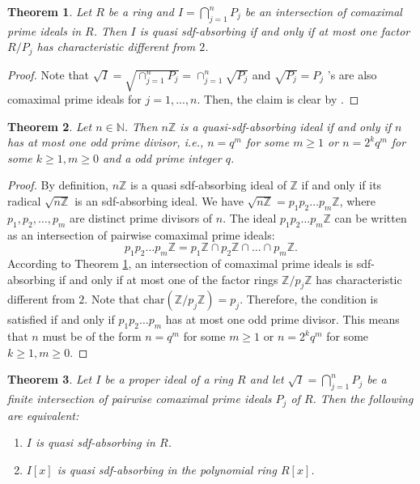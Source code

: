 \documentclass{amsart}%
\newtheorem{theorem}{Theorem}[section]
\begin{document}
\begin{theorem}
\label{Th} Let $R$ be a ring and $I=\bigcap_{j=1}^{n}P_{j}$ be an intersection
of comaximal prime ideals in $R$. Then $I$ is quasi sdf-absorbing if and only
if at most one factor $R/P_{j}$ has characteristic different from $2$.
\end{theorem}

\begin{proof}
Note that $\sqrt{I}=\sqrt{\cap_{j=1}^{n}P_{j}}=\cap_{j=1}^{n}\sqrt{P_{j}}$ and
$\sqrt{P_{j}}=P_{j}$ 's are also comaximal prime ideals for $j=1,...,n.$ Then,
the claim is clear by \cite[Theorem 4.1]{AB2024}.
\end{proof}

\begin{theorem}
Let $n\in\mathbb{N}$. Then $n\mathbb{Z}$ is a quasi-sdf-absorbing ideal if and
only if $n$ has at most one odd prime divisor, i.e., $n=q^{m}$ for some
$m\geq1$ or $n=2^{k}q^{m}$ for some $k\geq1,m\geq0$ and a odd prime integer
$q$.
\end{theorem}

\begin{proof}
By definition, $n\mathbb{Z}$ is a quasi sdf-absorbing ideal of $\mathbb{Z}$ if
and only if its radical $\sqrt{n\mathbb{Z}}$ is an sdf-absorbing ideal. We
have $\sqrt{n\mathbb{Z}}=p_{1}p_{2}\dots p_{m}\mathbb{Z}$, where $p_{1}%
,p_{2},\dots,p_{m}$ are distinct prime divisors of $n$. The ideal $p_{1}%
p_{2}\dots p_{m}\mathbb{Z}$ can be written as an intersection of pairwise
comaximal prime ideals:
\[
p_{1}p_{2}\dots p_{m}\mathbb{Z}=p_{1}\mathbb{Z}\cap p_{2}\mathbb{Z}\cap
\dots\cap p_{m}\mathbb{Z}.
\]
According to Theorem \ref{Th}, an intersection of comaximal prime ideals is
sdf-absorbing if and only if at most one of the factor rings $\mathbb{Z}%
/p_{j}\mathbb{Z}$ has characteristic different from $2$. Note that
$\text{char}(\mathbb{Z}/p_{j}\mathbb{Z})=p_{j}$. Therefore, the condition is
satisfied if and only if $p_{1}p_{2}\dots p_{m}$ has at most one odd prime
divisor. This means that $n$ must be of the form $n=q^{m}$ for some $m\geq1$
or $n=2^{k}q^{m}$ for some $k\geq1,m\geq0.$
\end{proof}

\begin{theorem}
Let $I$ be a proper ideal of a ring $R$ and let $\sqrt{I}=\bigcap_{j=1}%
^{n}P_{j}$ be a finite intersection of pairwise comaximal prime ideals $P_{j}$
of $R$. Then the following are equivalent:

\begin{enumerate}
\item $I$ is quasi sdf-absorbing in $R$.

\item $I[x]$ is quasi sdf-absorbing in the polynomial ring $R[x]$.
\end{enumerate}
\end{theorem}
\end{document}
